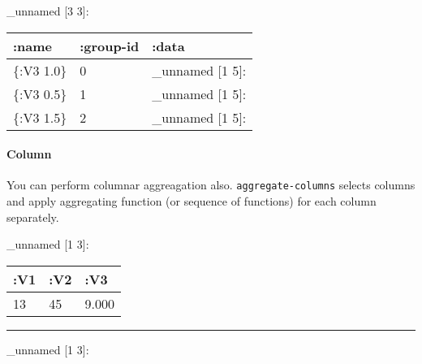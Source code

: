 \documentclass[]{article}
\newenvironment{Shaded}{\begin{snugshade}}{\end{snugshade}}
\newcommand{\KeywordTok}[1]{\textcolor[rgb]{0.13,0.29,0.53}{\textbf{#1}}}
\newcommand{\VariableTok}[1]{\textcolor[rgb]{0.00,0.00,0.00}{#1}}
\newcommand{\AttributeTok}[1]{\textcolor[rgb]{0.77,0.63,0.00}{#1}}
\newcommand{\NormalTok}[1]{#1}
\let\oldparagraph\paragraph
\renewcommand{\paragraph}[1]{\oldparagraph{#1}\mbox{}}
\begin{document}
\_unnamed {[}3 3{]}:

\begin{longtable}[]{@{}lll@{}}
\toprule
:name & :group-id & :data\tabularnewline
\midrule
\endhead
\{:V3 1.0\} & 0 & \_unnamed {[}1 5{]}:\tabularnewline
\{:V3 0.5\} & 1 & \_unnamed {[}1 5{]}:\tabularnewline
\{:V3 1.5\} & 2 & \_unnamed {[}1 5{]}:\tabularnewline
\bottomrule
\end{longtable}

\paragraph{Column}\label{column}

You can perform columnar aggreagation also. \texttt{aggregate-columns}
selects columns and apply aggregating function (or sequence of
functions) for each column separately.

\begin{Shaded}
\end{Shaded}

\_unnamed {[}1 3{]}:

\begin{longtable}[]{@{}lll@{}}
\toprule
:V1 & :V2 & :V3\tabularnewline
\midrule
\endhead
13 & 45 & 9.000\tabularnewline
\bottomrule
\end{longtable}

\begin{center}\rule{0.5\linewidth}{0.5pt}\end{center}

\begin{Shaded}
\end{Shaded}

\_unnamed {[}1 3{]}:
\end{document}
